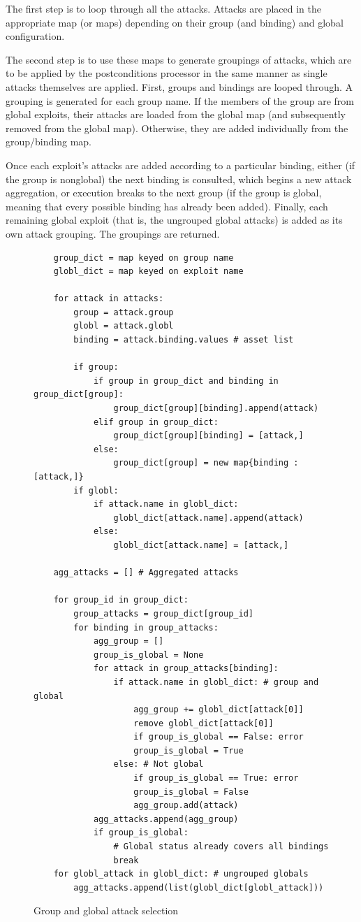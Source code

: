 The first step is to loop through all the attacks. Attacks are placed in the
appropriate map (or maps) depending on their group (and binding) and global
configuration.

The second step is to use these maps to generate groupings of attacks, which
are to be applied by the postconditions processor in the same manner as single
attacks themselves are applied. First, groups and bindings are looped through.
A grouping is generated for each group name. If the members of the group are
from global exploits, their attacks are loaded from the global map (and
subsequently removed from the global map). Otherwise, they are added individually
from the group/binding map.

Once each exploit's attacks are added according to a particular binding, either
(if the group is nonglobal) the next binding is consulted, which begins a new
attack aggregation, or execution breaks to the next group (if the group is
global, meaning that every possible binding has already been added). Finally,
each remaining global exploit (that is, the ungrouped global attacks) is
added as its own attack grouping. The groupings are returned.
\begin{figure}
\begin{lstlisting}
    group_dict = map keyed on group name
    globl_dict = map keyed on exploit name
    
    for attack in attacks:
        group = attack.group
        globl = attack.globl
        binding = attack.binding.values # asset list

        if group:
            if group in group_dict and binding in group_dict[group]:
                group_dict[group][binding].append(attack)
            elif group in group_dict:
                group_dict[group][binding] = [attack,]
            else:
                group_dict[group] = new map{binding : [attack,]}
        if globl:
            if attack.name in globl_dict:
                globl_dict[attack.name].append(attack)
            else:
                globl_dict[attack.name] = [attack,]
    
    agg_attacks = [] # Aggregated attacks

    for group_id in group_dict:
        group_attacks = group_dict[group_id]
        for binding in group_attacks:
            agg_group = []
            group_is_global = None
            for attack in group_attacks[binding]:
                if attack.name in globl_dict: # group and global
                    agg_group += globl_dict[attack[0]]
                    remove globl_dict[attack[0]]
                    if group_is_global == False: error
                    group_is_global = True
                else: # Not global
                    if group_is_global == True: error
                    group_is_global = False
                    agg_group.add(attack)
            agg_attacks.append(agg_group)
            if group_is_global:
                # Global status already covers all bindings
                break
    for globl_attack in globl_dict: # ungrouped globals
        agg_attacks.append(list(globl_dict[globl_attack]))
\end{lstlisting}
\caption{Group and global attack selection}
\label{fig:cpe_glgr_precondition_pc}
\end{figure}
